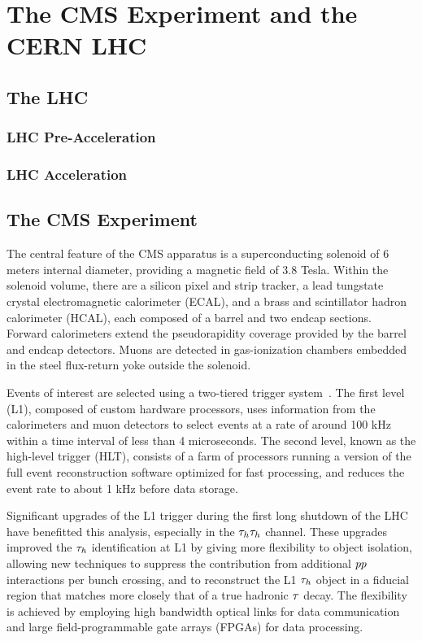 \chapter{The CMS Experiment and the CERN LHC}

\section{The LHC}

\subsection{LHC Pre-Acceleration}

\subsection{LHC Acceleration}

\section{The CMS Experiment}

The central feature of the CMS apparatus is a superconducting solenoid of 6 meters internal diameter, providing a magnetic field of 3.8 Tesla. Within the solenoid volume, there are a silicon pixel and strip tracker, a lead tungstate crystal electromagnetic calorimeter (ECAL), and a brass and scintillator hadron calorimeter (HCAL), each composed of a barrel and two endcap sections. Forward calorimeters extend the pseudorapidity coverage provided by the barrel and endcap detectors. Muons are detected in gas-ionization chambers embedded in the steel flux-return yoke outside the solenoid.

Events of interest are selected using a two-tiered trigger system~\cite{Khachatryan:2016bia}. The first level (L1), composed of custom hardware processors, uses information from the calorimeters and muon detectors to select events at a rate of around 100 kHz within a time interval of less than 4 microseconds. The second level, known as the high-level trigger (HLT), consists of a farm of processors running a version of the full event reconstruction software optimized for fast processing, and reduces the event rate to about 1 kHz before data storage.

Significant upgrades of the L1 trigger during the first long shutdown of the LHC have benefitted this analysis, especially in the $\tau_{h}\tau_{h}$ channel. These upgrades improved the $\tau_{h}$ identification at L1 by giving more flexibility to object isolation, allowing new techniques to suppress the contribution from additional $pp$ interactions per bunch
crossing, and to reconstruct the L1 $\tau_{h}$ object in a fiducial region that matches more closely that of a true hadronic $\tau$ decay. The flexibility is achieved by employing high bandwidth optical links for data communication and large field-programmable gate arrays (FPGAs) for data processing.

